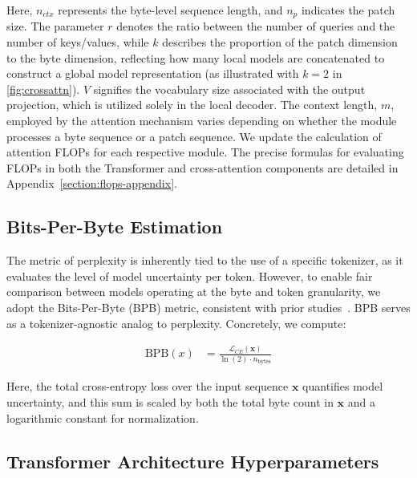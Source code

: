 Here, $n_{ctx}$ represents the byte-level sequence length, and $n_p$ indicates the patch size. The parameter $r$ denotes the ratio between the number of queries and the number of keys/values, while $k$ describes the proportion of the patch dimension to the byte dimension, reflecting how many local models are concatenated to construct a global model representation (as illustrated with $k=2$ in \autoref{fig:crossattn}). $V$ signifies the vocabulary size associated with the output projection, which is utilized solely in the local decoder. The context length, $m$, employed by the attention mechanism varies depending on whether the module processes a byte sequence or a patch sequence. We update the calculation of attention FLOPs for each respective module. The precise formulas for evaluating FLOPs in both the Transformer and cross-attention components are detailed in Appendix~\ref{section:flops-appendix}.

\subsection{Bits-Per-Byte Estimation} The metric of perplexity is inherently tied to the use of a specific tokenizer, as it evaluates the level of model uncertainty per token. However, to enable fair comparison between models operating at the byte and token granularity, we adopt the Bits-Per-Byte (BPB) metric, consistent with prior studies~\citep{xue2022byt5, yu2023megabyte, wang2024mambabyte}. BPB serves as a tokenizer-agnostic analog to perplexity. Concretely, we compute:

\begin{align}
    \text{BPB}(x)&= \frac{\mathcal{L}_{CE}(\pmb{x})}{\ln(2)\cdot n_{\text{bytes}}}
\end{align}

Here, the total cross-entropy loss over the input sequence $\pmb{x}$ quantifies model uncertainty, and this sum is scaled by both the total byte count in $\pmb{x}$ and a logarithmic constant for normalization.

\subsection{Transformer Architecture Hyperparameters} 

